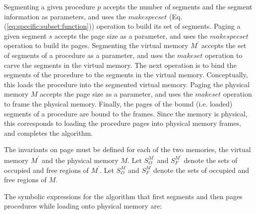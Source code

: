 \documentclass[draft]{article}
\begin{document}
Segmenting a  given procedure $p$  accepts the number of  segments and
the  segment information  as  parameters, and  uses the  $makespecset$
(Eq.(\ref{eq:specific:subset:function})) operation to build its set of
segments.   Paging a  given segment  $s$ accepts  the page  size  as a
parameter, and  uses the $makespecset$  operation to build  its pages.
Segmenting the  virtual memory $M^\prime$ accepts the  set of segments
of a  procedure as  a parameter, and  uses the $makeset$  operation to
carve the  segments in the virtual  memory.  The next  operation is to
bind  the segments of  the procedure  to the  segments in  the virtual
memory.   Conceptually, this  loads the  procedure into  the segmented
virtual memory.  Paging the physical  memory $M$ accepts the page size
as a parameter, and uses the $makeset$ operation to frame the physical
memory.  Finally, the pages of  the bound (i.e.  loaded) segments of a
procedure are bound to the frames.  Since the memory is physical, this
corresponds  to  loading  the  procedure pages  into  physical  memory
frames, and completes the algorithm.

The  invariants  on  page \pageref{eq:total:size:invariance}  must  be
defined for  each of the  two memories, the virtual  memory $M^\prime$
and   the    physical   memory   $M$.     Let   $S_O^{M^\prime}$   and
$S_F^{M^\prime}$  denote the  sets  of occupied  and  free regions  of
$M^\prime$.  Let  $S_O^{M}$ and $S_F^{M}$ denote the  sets of occupied
and free regions of $M$.

The  symbolic expressions for  the algorithm  that first  segments and
then pages procedures while loading onto physical memory are:
\end{document}
